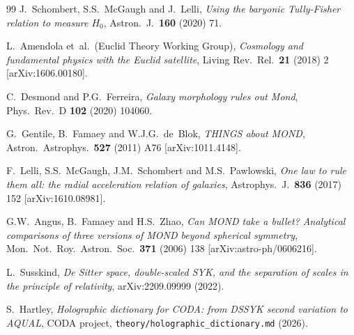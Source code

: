 \documentclass[a4paper,11pt]{article}
\begin{document}
\begin{thebibliography}{99}
  J.~Schombert, S.S.~McGaugh and J.~Lelli,
  \emph{Using the baryonic Tully-Fisher relation to measure $H_0$},
  Astron.\ J.\ \textbf{160} (2020) 71.

  L.~Amendola et~al.\ (Euclid Theory Working Group),
  \emph{Cosmology and fundamental physics with the Euclid satellite},
  Living Rev.\ Rel.\ \textbf{21} (2018) 2 [arXiv:1606.00180].

  C.~Desmond and P.G.~Ferreira,
  \emph{Galaxy morphology rules out Mond},
  Phys.\ Rev.\ D \textbf{102} (2020) 104060.

  G.~Gentile, B.~Famaey and W.J.G.~de~Blok,
  \emph{THINGS about MOND},
  Astron.\ Astrophys.\ \textbf{527} (2011) A76 [arXiv:1011.4148].

  F.~Lelli, S.S.~McGaugh, J.M.~Schombert and M.S.~Pawlowski,
  \emph{One law to rule them all: the radial acceleration relation of
  galaxies},
  Astrophys.\ J.\ \textbf{836} (2017) 152 [arXiv:1610.08981].

  G.W.~Angus, B.~Famaey and H.S.~Zhao,
  \emph{Can MOND take a bullet? Analytical comparisons of three versions of
  MOND beyond spherical symmetry},
  Mon.\ Not.\ Roy.\ Astron.\ Soc.\ \textbf{371} (2006) 138
  [arXiv:astro-ph/0606216].

  L.~Susskind,
  \emph{De Sitter space, double-scaled SYK, and the separation of scales
  in the principle of relativity},
  arXiv:2209.09999 (2022).

  S.~Hartley,
  \emph{Holographic dictionary for CODA: from DSSYK second variation to
  AQUAL},
  CODA project, \texttt{theory/holographic\_dictionary.md} (2026).

\end{thebibliography}
\end{document}
